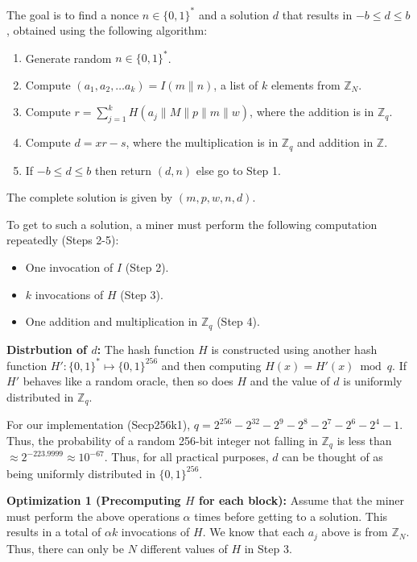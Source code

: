\documentclass[runningheads]{llncs}
\begin{document}
The goal is to find a nonce $n\in \{0,1\}^*$ and a solution $d$ that results in $-b \leq d\leq b$, obtained using the following algorithm:

\begin{enumerate}
	\item Generate random $n\in \{0,1\}^*$.
	\item Compute $(a_1, a_2, \ldots a_k) = I(m\|n)$,  
	a list of $k$ elements from $\mathbb{Z}_N$.
	\item Compute $r = \sum^{k}_{j=1} H(a_j\|M\|{p}\|m\|w)$, where the addition is in $\mathbb{Z}_q$.
	\item Compute $d = xr- {s}$, where the multiplication is in $\mathbb{Z}_q$ and addition in $\mathbb{Z}$.
	\item If $-b \leq d \leq b$ then return $(d, n)$ else go to Step 1.
\end{enumerate}

The complete solution is given by $(m, {p}, w, n, d)$. 

To get to such a solution, a miner must perform the following computation repeatedly (Steps 2-5):
\begin{itemize}
	\item One invocation of $I$ (Step 2).
	\item $k$ invocations of $H$ (Step 3).
	\item One addition and multiplication in $\mathbb{Z}_q$ (Step 4).
	
\end{itemize}

\textbf{Distrbution of $d$:} The hash function $H$ is constructed using another hash function $H':\{0,1\}^*\mapsto\{0,1\}^{256}$ and then computing $H(x)= H'(x) \bmod{q}$. If $H'$ behaves like a random oracle, then so does $H$ and the value of $d$ is uniformly distributed in $\mathbb{Z}_q$. 

For our implementation (Secp256k1), $q = 2^{256} - 2^{32} - 2^{9} - 2^8 - 2^7 - 2^6 - 2^4 - 1$. Thus, the probability of a random 256-bit integer not falling in $\mathbb{Z}_q$ is less than $\approx 2^{-223.9999}\approx 10^{-67}$. Thus, for all practical purposes, $d$ can be thought of as being uniformly distributed in $\{0, 1\}^{256}$.

\textbf{Optimization 1 (Precomputing $H$ for each block):} 
Assume that the miner must perform the above operations $\alpha$ times before getting to a solution. This results in a total of $\alpha k$ invocations of $H$. 
We know that each $a_j$ above is from $\mathbb{Z}_N$. Thus, there can only be $N$ different values of $H$ in Step 3. 
\end{document}
